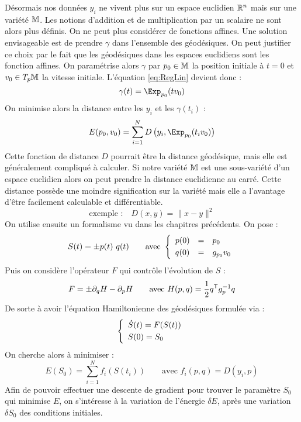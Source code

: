 Désormais nos données $y_i$ ne vivent plus sur un espace euclidien $\R^n$ mais sur une variété $\M$. Les notions d'addition et de multiplication par un scalaire ne sont alors plus définis. On ne peut plus considérer de fonctions affines. Une solution envisageable est de prendre $\gamma$ dans l'ensemble des géodésiques. On peut justifier ce choix par le fait que les géodésiques dans les espaces euclidiens sont les fonction affines. On paramétrise alors $\gamma$ par $p_0 \in \M$ la position initiale à $t=0$ et $v_0 \in T_p \M$ la vitesse initiale. L'équation \eqref{eq:RegLin} devient donc :
\begin{equation}
	\gamma(t) = \Exp_{p_0} (t v_0)
\end{equation}
On minimise alors la distance entre les $y_i$ et les $\gamma(t_i)$ :
$$ E(p_0, v_0) = \sum_{i=1}^N D \left( y_i, \Exp_{p_0}(t_i v_0) \right) $$
Cette fonction de distance $D$ pourrait être la distance géodésique, mais elle est généralement compliqué à calculer. Si notre variété $\M$ est une sous-variété d'un espace euclidien alors on peut prendre la distance euclidienne au carré. Cette distance possède une moindre signification sur la variété mais elle a l'avantage d'être facilement calculable et différentiable.
$$ \text{exemple :} \quad D(x, y) = \| x - y \|^2 $$
On utilise ensuite un formalisme vu dans les chapitres précédents. On pose :
\begin{equation}
	S(t) = \pm{p(t) \\[1mm]\ q(t)} \qquad \text{avec } \syst{lll}{p(0) & = & p_0 \\[1mm] q(0) & = & g_{p_0} v_0}
\end{equation}
Puis on considère l'opérateur $F$ qui contrôle l'évolution de $S$ :
\begin{equation}
	\label{eq:op_F}
	F = \pm{\partial_q H \\[1mm] - \partial_p H} \qquad \text{avec } H(p, q) = \frac{1}{2} q^\trans g_p^{-1} q
\end{equation}
De sorte à avoir l'équation Hamiltonienne des géodésiques formulée via :
\begin{equation}
	\label{eq:evol_S}
	\syst{lll}{
		\dot{S}(t) = F(S(t)) \\[1mm]
		S(0) = S_0
	}
\end{equation}
On cherche alors à minimiser :
\begin{equation}
	E(S_0) = \sum_{i=1}^N f_i(S(t_i)) \qquad \text{avec } f_i(p, q) = D(y_i, p)
\end{equation}
Afin de pouvoir effectuer une descente de gradient pour trouver le paramètre $S_0$ qui minimise $E$, on s'intéresse à la variation de l'énergie $\delta E$, après une variation $\delta S_0$ des conditions initiales.
